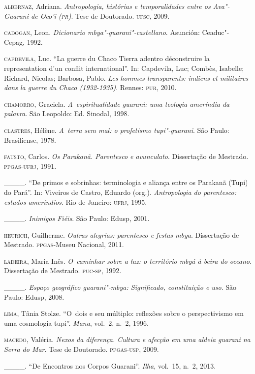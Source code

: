 \begin{Parskip}
\textsc{albernaz}, Adriana. \emph{Antropologia, histórias e
temporalidades entre os Ava"-Guarani de Oco’i (\textsc{pr})}. Tese de Doutorado.
\textsc{ufsc}, 2009.

\textsc{cadogan}, Leon. \emph{Dicionario mbya"-guarani"-castellano}. Asunción: Ceaduc"-
Cepag, 1992.

\textsc{capdevila}, Luc. ``La guerre du Chaco Tierra adentro déconstruire la
representation d’un conflit international''. In: Capdevila, Luc;
Combès, Isabelle; Richard, Nicolas; Barbosa, Pablo. \emph{Les
hommes transparents: indiens et militaires dans la guerre du Chaco
(1932-1935)}. Rennes: \textsc{pur}, 2010.

\textsc{chamorro}, Graciela. \emph{A~espiritualidade guarani: uma teologia ameríndia
da palavra}. São Leopoldo: Ed. Sinodal, 1998.

\textsc{clastres}, Hélène. \emph{A~terra sem mal: o profetismo tupi"-guarani}. São Paulo:
Brasiliense, 1978.

\textsc{fausto}, Carlos. \emph{Os Parakanã. Parentesco e avunculato}. Dissertação de
Mestrado. \textsc{ppgas}-\textsc{ufrj}, 1991.

\_\_\_\_. ``De primos e sobrinhas: terminologia e aliança entre os Parakanã
(Tupi) do Pará''. In: Viveiros de Castro, Eduardo (org.). \emph{Antropologia do
parentesco: estudos ameríndios}. Rio de Janeiro: \textsc{ufrj}, 1995.

\_\_\_\_. \emph{Inimigos Fiéis}. São Paulo: Edusp, 2001.

\textsc{heurich}, Guilherme. \emph{Outras alegrias: parentesco e festas mbya}.
 Dissertação de Mestrado. \textsc{ppgas}-Museu Nacional, 2011.

\textsc{ladeira}, Maria Inês. \emph{O~caminhar sobre a luz: o território mbyá à beira
do oceano}. Dissertação de Mestrado. \textsc{puc}-\textsc{sp}, 1992.

\_\_\_\_. \emph{Espaço geográfico guarani"-mbya: Significado,
constituição e uso}. São Paulo: Edusp, 2008.

\textsc{lima}, Tânia Stolze. ``O~dois e seu múltiplo: reflexões sobre o
perspectivismo em uma cosmologia tupi''. \emph{Mana}, vol.~2, n.~2, 1996.

\textsc{macedo}, Valéria. \emph{Nexos da diferença. Cultura e afecção em uma aldeia
guarani na Serra do Mar}. Tese de Doutorado. \textsc{ppgas}-\textsc{usp}, 2009.

\_\_\_\_. ``De Encontros nos Corpos Guarani''. \emph{Ilha}, vol.~15, n.~2, 2013.


\end{Parskip}
